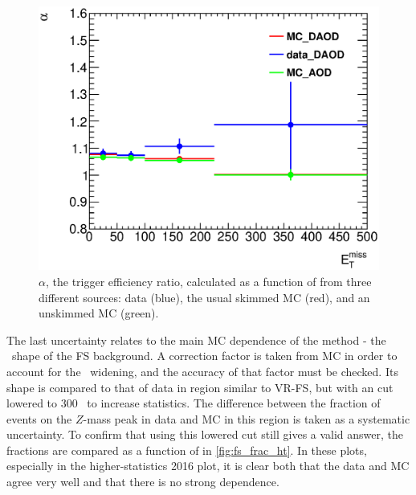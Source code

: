 \begin{centering}
\begin{figure}[bth]
\myfloatalign
\includegraphics[width=.85\linewidth]{figures/fs/trigger_ratios.eps}
\caption{$\alpha$, the trigger efficiency ratio, calculated as a function of \met from three different sources: data (blue), the usual skimmed \ttbar \ac{MC} (red), and an unskimmed \ttbar \ac{MC} (green).}
\label{fig:fs_alpha}
\end{figure}
\end{centering}

The last uncertainty relates to the main \ac{MC} dependence of the method - the \mll~shape of the \ac{FS} background. A correction factor is taken from \ac{MC} in order to account for the \mll~widening, and the accuracy of that factor must be checked. Its shape is compared to that of data in region similar to VR-FS, but with an \HT cut lowered to 300 \gev~to increase statistics. The difference between the fraction of events on the $Z$-mass peak in data and \ac{MC} in this region is taken as a systematic uncertainty. To confirm that using this lowered \HT cut still gives a valid answer, the fractions are compared as a function of \HT in \autoref{fig:fs_frac_ht}. In these plots, especially in the higher-statistics 2016 plot, it is clear both that the data and \ac{MC} agree very well and that there is no strong \HT dependence. 

